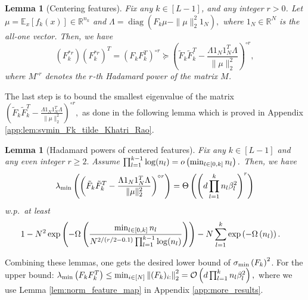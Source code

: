 \documentclass[11pt]{article}
\newcommand{\revision}[1]{#1}
\def\RR{\mathbb{R}}
\def\diag{\operatorname{\mathop{diag}}}
\newcommand{\E}{\mathbb{E}}
\newtheorem{lemma}[theorem]{Lemma}
\newcommand{\littleO}[1]{o\left(#1\right)}
\newcommand{\bigO}[1]{\mathcal{O}\left(#1\right)}
\newcommand{\bigOmg}[1]{\Omega\left(#1\right)}
\newcommand{\bigTheta}[1]{\Theta\left(#1\right)}
\newcommand{\bigexp}[1]{\exp\left(#1\right)}
\newcommand{\norm}[1]{\left\|#1\right\|}
\newcommand{\svmin}[1]{\sigma_{\rm min}\left(#1\right)}
\newcommand{\evmin}[1]{\lambda_{\rm min}\left(#1\right)}
\def\min{\mathop{\rm min}\nolimits}
\begin{document}
\begin{lemma}[Centering features]\label{lem:Fk_vs_Fk_tilde}
    Fix any $k\in[L-1]$, and any integer $r>0$. \revision{Let $\mu=\E_x[f_k(x)]\in\RR^{n_{k}}$ and $\Lambda = \diag(F_k\mu-\|\mu\|_2^2 1_N),$ where $1_N\in\RR^N$ is the all-one vector. 
    Then, we have 
    \begin{equation}
	(F_{k}^{*r}) (F_{k}^{*r})^T=(F_kF_k^T)^{\circ r} \succeq \left(\tilde F_k\tilde F_k^T-\frac{\Lambda 1_N 1_N^T\Lambda}{\|\mu\|_2^2}\right)^{\circ r},
    \end{equation}
    where $M^{\circ r}$ denotes the $r$-th Hadamard power of the matrix $M$.}
\end{lemma}
The last step is to bound the smallest eigenvalue of the \revision{matrix  $\left(\tilde F_k\tilde F_k^T-\frac{\Lambda 1_N 1_N^T\Lambda}{\|\mu\|_2^2}\right)^{\circ r},$} as done in the following lemma which is proved in Appendix \ref{app:lem:svmin_Fk_tilde_Khatri_Rao}. 
\begin{lemma}[\revision{Hadamard} powers of centered features]\label{lem:svmin_Fk_tilde_Khatri_Rao}
    Fix any $k\in[L-1]$ and any \revision{even integer $r\ge 2.$ }
    Assume $\prod_{l=1}^{k-1} \log(n_l)=\littleO{\min_{l\in[0,k]} n_l}.$
    Then, we have
    \begin{equation}\label{eq:dresnew}
	\evmin{\left(\tilde F_k\tilde F_k^T-\frac{\Lambda 1_N 1_N^T\Lambda}{\|\mu\|_2^2}\right)^{\circ r}}
	= \bigTheta{ \left( d \prod_{l=1}^{k} n_l\beta_l^2 \right)^r } 
    \end{equation}
    w.p.\ at least
    \begin{align}\label{eq:problemma}
	 &1 - N^2 \bigexp{ - \bigOmg{ \frac{\min_{l\in[0,k]}n_l}{N^{2/(\revision{r/2}-0.1)} \prod_{l=1}^{k-1}\log(n_l)} } } - N \sum_{l=1}^{k} \bigexp{-\bigOmg{n_l}} .
    \end{align}
\end{lemma}
    Combining these lemmas, one gets the desired lower bound of $\svmin{F_k}^2$.
    For the upper bound: $\evmin{F_kF_k^T}\leq \min_{i\in[N]}\norm{(F_k)_{i:}}_2^2 = \bigO{d\prod_{l=1}^{k} n_l\beta_l^2},$
    where we use Lemma \ref{lem:norm_feature_map} in Appendix \ref{app:more_results}.

\end{document}
